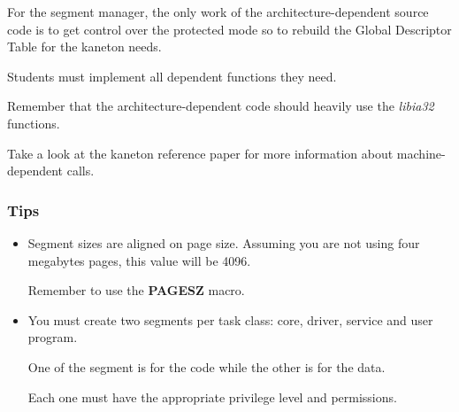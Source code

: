 For the segment manager, the only work of the architecture-dependent source
code is to get control over the protected mode so to rebuild the Global
Descriptor Table for the kaneton needs.

Students must implement all dependent functions they need.

Remember that the architecture-dependent code should heavily use the
\textit{libia32} functions.

Take a look at the kaneton reference paper for more information about
machine-dependent calls.

%
%

\subsubsection{Tips}

\begin{itemize}
  \item
    Segment sizes are aligned on page size. Assuming you are not using
    four megabytes pages, this value will be 4096.

    Remember to use the \textbf{PAGESZ} macro.
  \item
    You must create two segments per task class: core, driver, service
    and user program.

    One of the segment is for the code while the other is for the data.

    Each one must have the appropriate privilege level and permissions.
\end{itemize}
